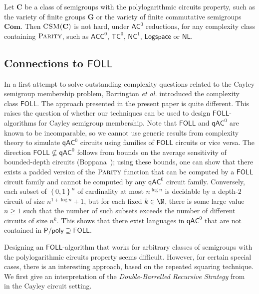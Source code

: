 \documentclass{toc}
\renewcommand{\geq}{\geqslant}
\renewcommand{\ge}{\geq}
\newcommand{\os}[1]{\ensuremath{\left\{#1\right\}}}
\newcommand{\FOLL}{\ensuremath{\mathsf{FOLL}}}
\newcommand{\AC}{\ensuremath{\mathsf{AC}}}
\newcommand{\ACC}{\ensuremath{\mathsf{ACC}}}
\newcommand{\qAC}{\ensuremath{\mathsf{qAC}}}
\newcommand{\TC}{\ensuremath{\mathsf{TC}}}
\newcommand{\NC}{\ensuremath{\mathsf{NC}}}
\newcommand{\LOGSPACE}{\ensuremath{\mathsf{Logspace}}}
\newcommand{\NL}{\ensuremath{\mathsf{NL}}}
\newcommand{\Ppoly}{\ensuremath{\mathsf{P / poly}}}
\newcommand{\vC}{\mathbf{C}}
\newcommand{\vCom}{\mathbf{Com}}
\newcommand{\vG}{\mathbf{G}}
\newcommand{\CSM}{\ensuremath{\textsc{CSM}}}
\newcommand{\Parity}{\ensuremath{\textsc{Parity}}}
\newcommand{\SCSM}{Cayley semigroup membership}
\newcommand{\SCSMP}{{\SCSM} problem}
\newcommand{\SPLCP}{polylogarithmic circuits property}
\begin{document}
\begin{corollary}
  Let $\vC$ be a class of semigroups with the {\SPLCP}, such as the variety of
  finite groups $\vG$ or the variety of finite commutative semigroups $\vCom$.
%
  Then $\CSM(\vC)$ is not hard,
  under $\AC^0$ reductions,  %
for any complexity class containing $\Parity$,
  such as $\ACC^0$, $\TC^0$, $\NC^1$, $\LOGSPACE$ or $\NL$.
%
  \label{crl:parity}
\end{corollary}

\subsection{Connections to \texorpdfstring{$\FOLL$}{FOLL}}
\label{sec:foll}

In a first attempt to solve outstanding complexity questions related to the
{\SCSMP}, Barrington {\it et al.} introduced the complexity class $\FOLL$. The
approach presented in the present paper is quite different. This raises the
question of whether our techniques can be used to design $\FOLL$-algorithms for
{\SCSM}.
%
Note that $\FOLL$ and $\qAC^0$ are known to be incomparable, so we cannot
use generic results from complexity theory to simulate $\qAC^0$ circuits using
families of $\FOLL$ circuits or vice versa.
%
The direction $\FOLL \not\subseteq \qAC^0$ follows from bounds on the average
sensitivity of bounded-depth
%
circuits (Boppana~\cite{Boppana97});  %
using these bounds, one
can show that there exists a padded version of the $\Parity$ function that can
be computed by a $\FOLL$ circuit family and cannot be computed by any $\qAC^0$
circuit family.
%
Conversely, each subset of $\os{0, 1}^n$ of cardinality at most $n^{\log n}$ is
decidable by a depth-$2$ circuit of size $n^{1+\log n} + 1$, but for each fixed
$k \in \N$, there is some large value $n \ge 1$ such that the number of such
subsets exceeds the number of different circuits of size $n^k$.
%
This shows that there exist languages in $\qAC^0$ that are not contained in
$\Ppoly \supseteq \FOLL$.

Designing an $\FOLL$-algorithm that works for arbitrary classes of semigroups
with the {\SPLCP} seems difficult.
%
However, for certain special cases, there is an interesting approach, based on
the repeated squaring technique.
%
We first give an interpretation of the \emph{Double-Barrelled Recursive
Strategy} from~\cite{BarringtonKLM01} in the Cayley circuit setting.
\end{document}
